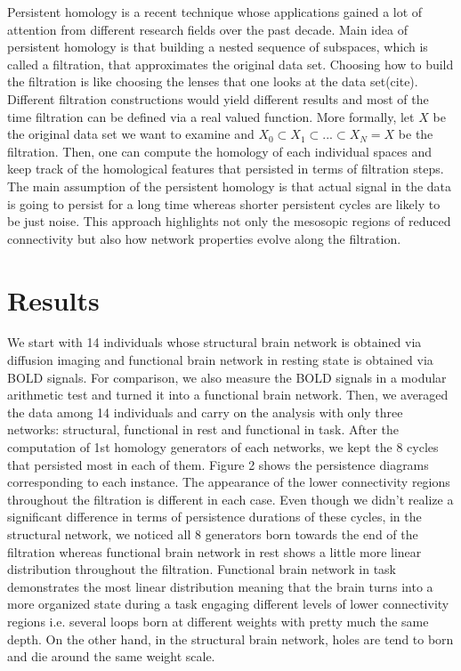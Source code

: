 \documentclass[9pt,twocolumn,twoside,lineno]{pnas-new}
\begin{document}
Persistent homology is a recent technique whose applications gained a lot of attention from different research fields over the past decade. Main idea of persistent homology is that building a nested sequence of subspaces, which is called a filtration, that approximates the original data set. Choosing how to build the filtration is like choosing the lenses that one looks at the data set(cite). Different filtration constructions would yield different results and most of the time filtration can be defined via a real valued function. More formally, let $X$ be the original data set we want to examine and $X_{0}\subset X_{1}\subset...\subset X_{N}=X $ be the filtration. Then, one can compute the homology of each individual spaces and keep track of the homological features that persisted in terms of filtration steps.  The main assumption of the persistent homology is that actual signal in the data is going to persist for a long time whereas shorter persistent cycles are likely to be just noise. This approach highlights not only the mesosopic regions of reduced connectivity but also how network properties evolve along the filtration.



\section*{Results}

We start with 14 individuals whose structural brain network is obtained via diffusion imaging and functional brain network in resting state is obtained via BOLD signals. For comparison, we also measure the BOLD signals in a modular arithmetic test and turned it into a functional brain network. Then, we averaged the data among 14 individuals and carry on the analysis with only three networks: structural, functional in rest and functional in task. After the computation of 1st homology generators of each networks, we kept the 8 cycles that persisted most in each of them. Figure 2 shows the persistence diagrams corresponding to each instance. The appearance of the lower connectivity regions throughout the filtration is different in each case. Even though we didn't realize a significant difference in terms of persistence durations of these cycles, in the structural network, we noticed all 8 generators born towards the end of the filtration whereas functional brain network in rest shows a little more linear distribution throughout the filtration. Functional brain network in task demonstrates the most linear distribution meaning that the brain turns into a more organized state during a task engaging different levels of lower connectivity regions i.e. several loops born at different weights with pretty much the same depth. On the other hand, in the structural brain network, holes are tend to born and die around the same weight scale. 
\end{document}
